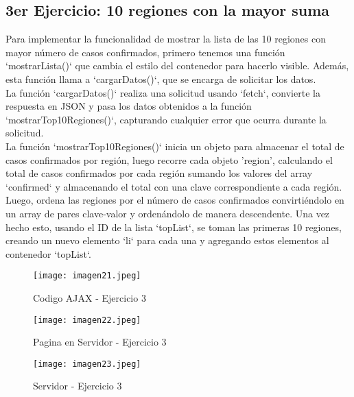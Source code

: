 \documentclass[10pt, a4paper]{article}
\begin{document}
	\subsection*{3er Ejercicio: 10 regiones con la mayor suma}
	\begin{flushleft}
		Para implementar la funcionalidad de mostrar la lista de las 10 regiones con mayor número de casos confirmados, primero tenemos una función `mostrarLista()` que cambia el estilo del contenedor para hacerlo visible. Además, esta función llama a `cargarDatos()`, que se encarga de solicitar los datos.\\
		La función `cargarDatos()` realiza una solicitud usando `fetch`, convierte la respuesta en JSON y pasa los datos obtenidos a la función `mostrarTop10Regiones()`, capturando cualquier error que ocurra durante la solicitud. \\
		La función `mostrarTop10Regiones()` inicia un objeto para almacenar el total de casos confirmados por región, luego recorre cada objeto 'region', calculando el total de casos confirmados por cada región sumando los valores del array `confirmed` y almacenando el total con una clave correspondiente a cada región. \\
		Luego, ordena las regiones por el número de casos confirmados convirtiéndolo en un array de pares clave-valor y ordenándolo de manera descendente. Una vez hecho esto, usando el ID de la lista `topList`, se toman las primeras 10 regiones, creando un nuevo elemento `li` para cada una y agregando estos elementos al contenedor `topList`.
	\end{flushleft}
	\begin{figure}[h]
		\centering
		\texttt{[image: imagen21.jpeg]}
		\caption{Codigo AJAX - Ejercicio 3}
	\end{figure}
	\begin{figure}[h]
		\centering
		\texttt{[image: imagen22.jpeg]}
		\caption{Pagina en Servidor - Ejercicio 3}
	\end{figure}
	\begin{figure}[h]
		\centering
		\texttt{[image: imagen23.jpeg]}
		\caption{Servidor - Ejercicio 3}
	\end{figure}
	\vspace*{8cm}
\end{document}
